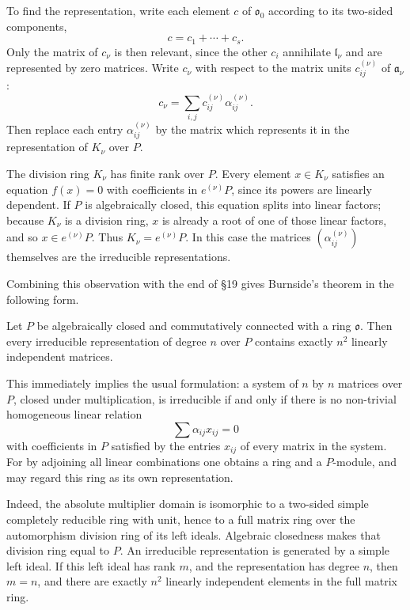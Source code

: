 \documentclass[
  11pt,
]{article}
\begin{document}
To find the representation, write each element \(c\) of
\(\mathfrak{o}_0\) according to its two-sided components, \[
  c=c_1+\cdots+c_s.
\] Only the matrix of \(c_\nu\) is then relevant, since the other
\(c_i\) annihilate \(\mathfrak l_\nu\) and are represented by zero
matrices. Write \(c_\nu\) with respect to the matrix units
\(c_{ij}^{(\nu)}\) of \(\mathfrak a_\nu\): \[
  c_\nu=\sum_{i,j} c_{ij}^{(\nu)}\alpha_{ij}^{(\nu)}.
\] Then replace each entry \(\alpha_{ij}^{(\nu)}\) by the matrix which
represents it in the representation of \(K_\nu\) over \(P\).

The division ring \(K_\nu\) has finite rank over \(P\). Every element
\(x\in K_\nu\) satisfies an equation \(f(x)=0\) with coefficients in
\(e^{(\nu)}P\), since its powers are linearly dependent. If \(P\) is
algebraically closed, this equation splits into linear factors; because
\(K_\nu\) is a division ring, \(x\) is already a root of one of those
linear factors, and so \(x\in e^{(\nu)}P\). Thus \(K_\nu=e^{(\nu)}P\).
In this case the matrices \((\alpha_{ij}^{(\nu)})\) themselves are the
irreducible representations.

Combining this observation with the end of §19 gives Burnside's theorem
in the following form.

Let \(P\) be algebraically closed and commutatively connected with a
ring \(\mathfrak{o}\). Then every irreducible representation of degree
\(n\) over \(P\) contains exactly \(n^2\) linearly independent matrices.

This immediately implies the usual formulation: a system of \(n\) by
\(n\) matrices over \(P\), closed under multiplication, is irreducible
if and only if there is no non-trivial homogeneous linear relation \[
  \sum \alpha_{ij}x_{ij}=0
\] with coefficients in \(P\) satisfied by the entries \(x_{ij}\) of
every matrix in the system. For by adjoining all linear combinations one
obtains a ring and a \(P\)-module, and may regard this ring as its own
representation.

Indeed, the absolute multiplier domain is isomorphic to a two-sided
simple completely reducible ring with unit, hence to a full matrix ring
over the automorphism division ring of its left ideals. Algebraic
closedness makes that division ring equal to \(P\). An irreducible
representation is generated by a simple left ideal. If this left ideal
has rank \(m\), and the representation has degree \(n\), then \(m=n\),
and there are exactly \(n^2\) linearly independent elements in the full
matrix ring.
\end{document}
